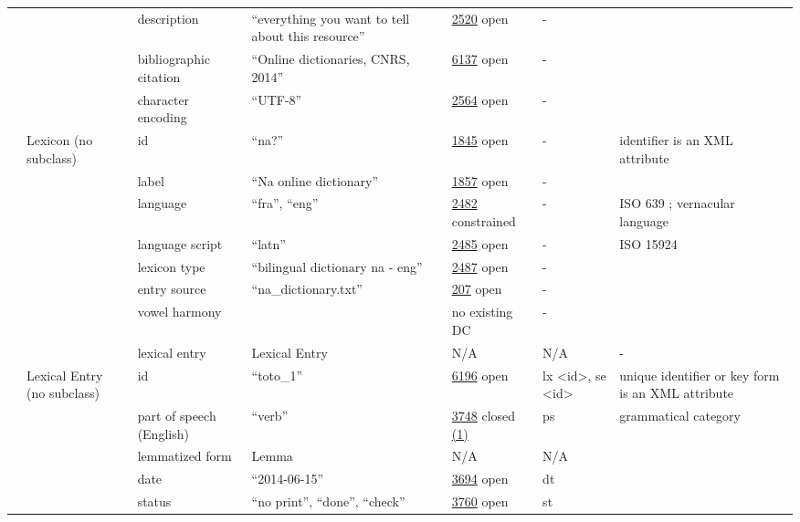 \documentclass[a4paper,12pt]{article}
\begin{document}
\begin{center}
\begin{longtable}{*7{p{2cm}}}
& & description & ``everything you want to tell about this resource” & \href{http://www.isocat.org/datcat/DC-2520}{2520} open & - & \\ \cmidrule{3-7}
& & bibliographic citation & ``Online dictionaries, CNRS, 2014” & \href{http://www.isocat.org/datcat/DC-6137}{6137} open & - & \\ \cmidrule{3-7}
& & character encoding & ``UTF-8” & \href{http://www.isocat.org/datcat/DC-2564}{2564} open & - & \\ \cmidrule{3-7}
& \multirow{7}{2cm}{Lexicon (no subclass)} & id & ``na?'' & \href{http://www.isocat.org/datcat/DC-1845}{1845} open & - & identifier is an XML attribute \\ \cmidrule{3-7}
& & label & ``Na online dictionary'' & \href{http://www.isocat.org/datcat/DC-1857}{1857} open & - & \\ \cmidrule{3-7}
& & language & ``fra'', ``eng'' & \href{http://www.isocat.org/datcat/DC-2482}{2482} constrained & - & ISO 639 ; vernacular language \\ \cmidrule{3-7}
& & language script & ``latn'' & \href{http://www.isocat.org/datcat/DC-2485}{2485} open & - & ISO 15924 \\ \cmidrule{3-7}
& & lexicon type & ``bilingual dictionary na - eng'' & \href{http://www.isocat.org/datcat/DC-2487}{2487} open & - & \\ \cmidrule{3-7}
& & entry source & ``na\_dic\-tio\-na\-ry.txt'' & \href{http://www.isocat.org/datcat/DC-207}{207} open & - & \\ \cmidrule{3-7}
& & vowel harmony & & no existing DC & - & \\ \cmidrule{3-7}
& & lexical entry & Lexical Entry & N/A & N/A & - \\ \cmidrule{2-7}
& \multirow{16}{2cm}{Lexical Entry (no subclass)} & id & ``toto\_1'' & \href{http://www.isocat.org/datcat/DC-6196}{6196} open & lx \textless id\textgreater, se \textless id\textgreater & unique identifier or key form is an XML attribute \\ \cmidrule{3-7}
& & part of speech (English) & ``verb'' & \href{http://www.isocat.org/datcat/DC-3748}{3748} closed \hyperlink{1}{(1)} \hypertarget{pos}{} & ps & grammatical category \\ \cmidrule{3-7}
& & lemmatized form & Lemma & N/A & N/A & \\ \cmidrule{3-7}
& & date & ``2014-06-15'' & \href{http://www.isocat.org/datcat/DC-3694}{3694} open & dt & \\ \cmidrule{3-7}
& & status & ``no print'', ``done'', ``check'' & \href{http://www.isocat.org/datcat/DC-3760}{3760} open & st & \\ \cmidrule{3-7}

\end{longtable}
\end{center}
\end{document}
